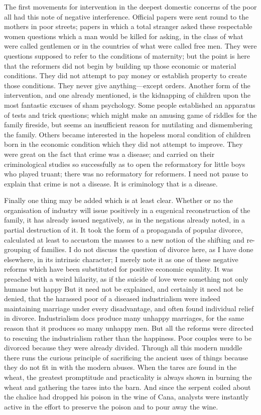\documentclass{book}
\begin{document}
The first movements for intervention in the deepest domestic concerns of the poor all had this note of negative interference. Official papers were sent round to the mothers in poor streets; papers in which a total stranger asked these respectable women questions which a man would be killed for asking, in the class of what were called gentlemen or in the countries of what were called free men. They were questions supposed to refer to the conditions of maternity; but the point is here that the reformers did not begin by building up those economic or material conditions. They did not attempt to pay money or establish property to create those conditions. They never give anything—except orders. Another form of the intervention, and one already mentioned, is the kidnapping of children upon the most fantastic excuses of sham psychology. Some people established an apparatus of tests and trick questions; which might make an amusing game of riddles for the family fireside, but seems an insufficient reason for mutilating and dismembering the family. Others became interested in the hopeless moral condition of children born in the economic condition which they did not attempt to improve. They were great on the fact that crime was a disease; and carried on their criminological studies so successfully as to open the reformatory for little boys who played truant; there was no reformatory for reformers. I need not pause to explain that crime is not a disease. It is criminology that is a disease.

Finally one thing may be added which is at least clear. Whether or no the organisation of industry will issue positively in a eugenical reconstruction of the family, it has already issued negatively, as in the negations already noted, in a partial destruction of it. It took the form of a propaganda of popular divorce, calculated at least to accustom the masses to a new notion of the shifting and re-grouping of families. I do not discuss the question of divorce here, as I have done elsewhere, in its intrinsic character; I merely note it as one of these negative reforms which have been substituted for positive economic equality. It was preached with a weird hilarity, as if the suicide of love were something not only humane but happy But it need not be explained, and certainly it need not be denied, that the harassed poor of a diseased industrialism were indeed maintaining marriage under every disadvantage, and often found individual relief in divorce. Industrialism docs produce many unhappy marriages, for the same reason that it produces so many unhappy men. But all the reforms were directed to rescuing the industrialism rather than the happiness. Poor couples were to be divorced because they were already divided. Through all this modern muddle there runs the curious principle of sacrificing the ancient uses of things because they do not fit in with the modern abuses. When the tares are found in the wheat, the greatest promptitude and practicality is always shown in burning the wheat and gathering the tares into the barn. And since the serpent coiled about the chalice had dropped his poison in the wine of Cana, analysts were instantly active in the effort to preserve the poison and to pour away the wine.
\end{document}
